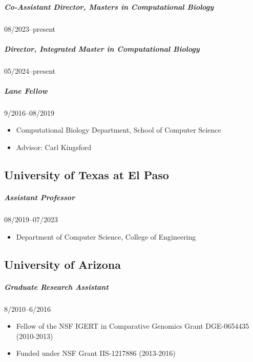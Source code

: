 \documentclass[10pt,letterpaper]{article}
\begin{document}
\subparagraph{Co-Assistant Director, Masters in Computational Biology} 08/2023--present
\vspace{-1em}

\subparagraph{Director, Integrated Master in Computational Biology} 05/2024--present
\vspace{-1em}

\subparagraph{Lane Fellow}  9/2016--08/2019
\begin{itemize}
    \item Computational Biology Department, School of Computer Science
    \item Advisor: Carl Kingsford
\end{itemize}

\subsection*{University of Texas at El Paso}
\vspace{-.75em}
\subparagraph{Assistant Professor}  08/2019--07/2023
\begin{itemize}
	\item Department of Computer Science, College of Engineering
\end{itemize}

\subsection*{University of Arizona}
\vspace{-.75em}

\subparagraph{Graduate Research Assistant} 8/2010--6/2016 
\begin{itemize}
    \item Fellow of the NSF IGERT in Comparative Genomics Grant DGE-0654435 (2010-2013)
    \item Funded under NSF Grant IIS-1217886 (2013-2016)
\end{itemize}
\end{document}
